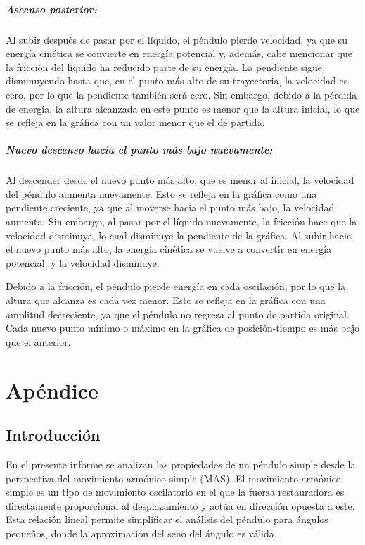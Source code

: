 \documentclass[letterpaper]{report}
\numberwithin{table}{section}
\begin{document}
\paragraph{Ascenso posterior:} Al subir después de pasar por el líquido, el
péndulo pierde velocidad, ya que su energía cinética se
convierte en energía potencial y, además, cabe mencionar que la
fricción del líquido ha reducido parte de su energía. La pendiente
sigue disminuyendo hasta que, en el punto más alto de su trayectoria,
la velocidad es cero, por lo que la pendiente también será cero. Sin
embargo, debido a la pérdida de energía, la altura alcanzada en este
punto es menor que la altura inicial, lo que se refleja en la gráfica
con un valor menor que el de partida.

\paragraph{Nuevo descenso hacia el punto más bajo nuevamente:} Al
descender desde el nuevo punto más alto, que es menor al inicial, la
velocidad del péndulo aumenta nuevamente. Esto se refleja en la
gráfica como una pendiente creciente, ya que al moverse hacia el
punto más bajo, la velocidad aumenta. Sin embargo, al pasar por el
líquido nuevamente, la fricción hace que la velocidad disminuya, lo
cual disminuye la pendiente de la gráfica. Al subir hacia el nuevo
punto más alto, la energía cinética se vuelve a convertir en energía
potencial, y la velocidad disminuye.

Debido a la fricción, el péndulo pierde energía en cada oscilación,
por lo que la altura que alcanza es cada vez menor. Esto se refleja
en la gráfica con una amplitud decreciente, ya que el péndulo no
regresa al punto de partida original. Cada nuevo punto mínimo o
máximo en la gráfica de posición-tiempo es más bajo que el anterior.

\chapter{Apéndice}

\section{Introducción}

En el presente informe se analizan las propiedades de un péndulo
simple desde la perspectiva del movimiento armónico simple (MAS). El
movimiento armónico simple es un tipo de movimiento oscilatorio en el
que la fuerza restauradora es directamente proporcional al
desplazamiento y actúa en dirección opuesta a este. Esta relación
lineal permite simplificar el análisis del péndulo para ángulos
pequeños, donde la aproximación del seno del ángulo es válida.
\end{document}
